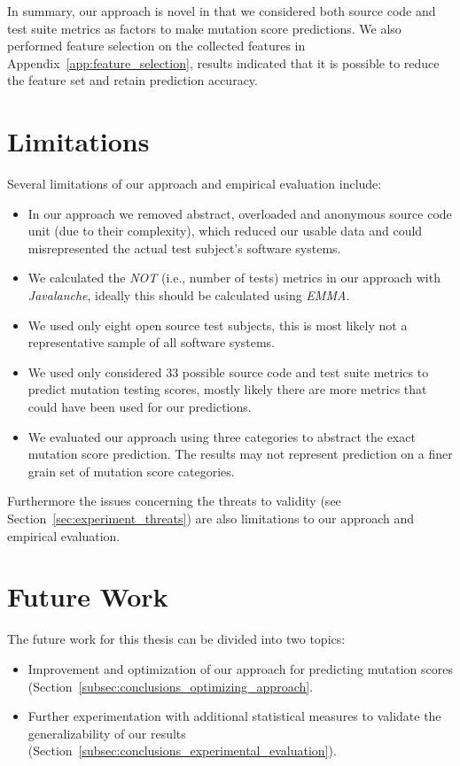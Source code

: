 In summary, our approach is novel in that we considered both source code and test suite metrics as factors to make mutation score predictions. We also performed feature selection on the collected features in Appendix~\ref{app:feature_selection}, results indicated that it is possible to reduce the feature set and retain prediction accuracy.


\section{Limitations}
\label{sec:conclusions_limitations}
Several limitations of our approach and empirical evaluation include:

\begin{itemize}
  \item In our approach we removed abstract, overloaded and anonymous source code unit (due to their complexity), which reduced our usable data and could misrepresented the actual test subject's software systems.
  \item We calculated the \emph{NOT} (i.e., number of tests) metrics in our approach with \emph{Javalanche}, ideally this should be calculated using \emph{EMMA}.
  \item We used only eight open source test subjects, this is most likely not a representative sample of all software systems.
  \item We used only considered 33 possible source code and test suite metrics to predict mutation testing scores, mostly likely there are more metrics that could have been used for our predictions.
  \item We evaluated our approach using three categories to abstract the exact mutation score prediction. The results may not represent prediction on a finer grain set of mutation score categories.
\end{itemize}

Furthermore the issues concerning the threats to validity (see Section~\ref{sec:experiment_threats}) are also limitations to our approach and empirical evaluation.


\section{Future Work}
\label{sec:conclusions_future_work}
The future work for this thesis can be divided into two topics:

\begin{itemize}
  \item Improvement and optimization of our approach for predicting mutation scores (Section~\ref{subsec:conclusions_optimizing_approach}.
  \item Further experimentation with additional statistical measures to validate the generalizability of our results (Section~\ref{subsec:conclusions_experimental_evaluation}).
\end{itemize}

